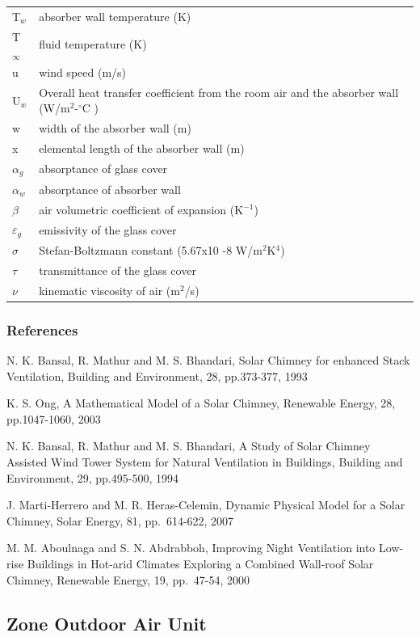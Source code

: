 \begin{longtable}[l]{p{1.5in}p{4.5in}}
T\(_{w}\) & absorber wall temperature (K) \tabularnewline
T\(_{\infty}\) & fluid temperature (K) \tabularnewline
u & wind speed (m/s) \tabularnewline
U\(_{w}\) & Overall heat transfer coefficient from the room air and the absorber wall (W/m\(^{2}\)-\(^{\circ}\)C ) \tabularnewline
w & width of the absorber wall (m) \tabularnewline
x & elemental length of the absorber wall (m) \tabularnewline
$\alpha$\(_{g}\) & absorptance of glass cover \tabularnewline
$\alpha$\(_{w}\) & absorptance of absorber wall \tabularnewline
$\beta$ & air volumetric coefficient of expansion (K\(^{-1}\)) \tabularnewline
$\varepsilon$\(_{g}\) & emissivity of the glass cover \tabularnewline
$\sigma$ & Stefan-Boltzmann constant (5.67x10 -8 W/m\(^{2}\)K\(^{4}\)) \tabularnewline
$\tau$ & transmittance of the glass cover \tabularnewline
$\nu$ & kinematic viscosity of air (m\(^{2}\)/s) \tabularnewline
\bottomrule
\end{longtable}

\subsubsection{References}\label{references-7-000}

N. K. Bansal, R. Mathur and M. S. Bhandari, Solar Chimney for enhanced Stack Ventilation, Building and Environment, 28, pp.373-377, 1993

K. S. Ong, A Mathematical Model of a Solar Chimney, Renewable Energy, 28, pp.1047-1060, 2003

N. K. Bansal, R. Mathur and M. S. Bhandari, A Study of Solar Chimney Assisted Wind Tower System for Natural Ventilation in Buildings, Building and Environment, 29, pp.495-500, 1994

J. Marti-Herrero and M. R. Heras-Celemin, Dynamic Physical Model for a Solar Chimney, Solar Energy, 81, pp.~614-622, 2007

M. M. Aboulnaga and S. N. Abdrabboh, Improving Night Ventilation into Low-rise Buildings in Hot-arid Climates Exploring a Combined Wall-roof Solar Chimney, Renewable Energy, 19, pp.~47-54, 2000

\subsection{Zone Outdoor Air Unit}\label{zone-outdoor-air-unit}

